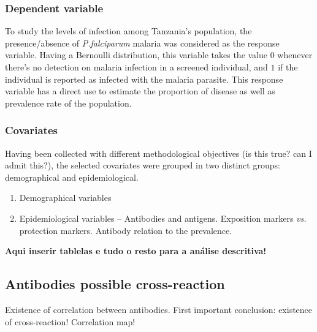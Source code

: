 \subsubsection{Dependent variable}

To study the levels of infection among Tanzania's population, the presence/absence of \textit{P.falciparum} malaria was considered as the response variable. Having a Bernoulli distribution, this variable takes the value $0$ whenever there's no detection on malaria infection in a screened individual, and $1$ if the individual is reported as infected with the malaria parasite. This response variable has a direct use to estimate the proportion of disease as well as prevalence rate of the population.

\subsubsection{Covariates}

Having been collected with different methodological objectives (is this true? can I admit this?), the selected covariates were grouped in two distinct groups: demographical and epidemiological.

\begin{enumerate}
\item Demographical variables 
\item Epidemiological variables -- Antibodies and antigens. Exposition markers \textit{vs.} protection markers. Antibody relation to the prevalence.
\end{enumerate}

\textbf{Aqui inserir tablelas e tudo o resto para a análise descritiva!}

\subsection{Antibodies possible cross-reaction}

Existence of correlation between antibodies. First important conclusion: existence of cross-reaction! Correlation map!
